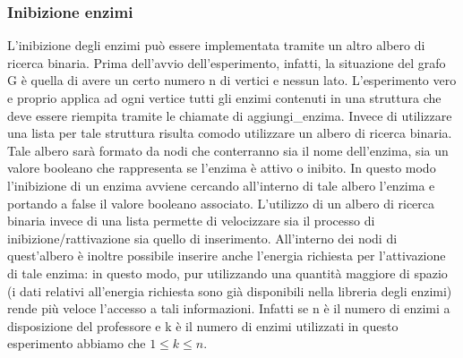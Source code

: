 \documentclass[a4paper,10pt]{article}
\begin{document}
\subsubsection{Inibizione enzimi}
L'inibizione degli enzimi può essere implementata tramite un altro albero di ricerca binaria. Prima dell'avvio dell'esperimento, infatti, la situazione del grafo G è quella di avere un certo numero n di vertici e nessun lato. L'esperimento vero e proprio applica ad ogni vertice tutti gli enzimi contenuti in una struttura che deve essere riempita tramite le chiamate di aggiungi\_enzima. Invece di utilizzare una lista per tale struttura risulta comodo utilizzare un albero di ricerca binaria. Tale albero sarà formato da nodi che conterranno sia il nome dell'enzima, sia un valore booleano che rappresenta se l'enzima è attivo o inibito. In questo modo l'inibizione di un enzima avviene cercando all'interno di tale albero l'enzima e portando a false il valore booleano associato. L'utilizzo di un albero di ricerca binaria invece di una lista permette di velocizzare sia il processo di inibizione/rattivazione sia quello di inserimento.
All'interno dei nodi di quest'albero è inoltre possibile inserire anche l'energia richiesta per l'attivazione di tale enzima: in questo modo, pur utilizzando una quantità maggiore di spazio (i dati relativi all'energia richiesta sono già disponibili nella libreria degli enzimi) rende più veloce l'accesso a tali informazioni. Infatti se n è il numero di enzimi a disposizione del professore e k è il numero di enzimi utilizzati in questo esperimento abbiamo che $1\le k \le n$.
\end{document}
